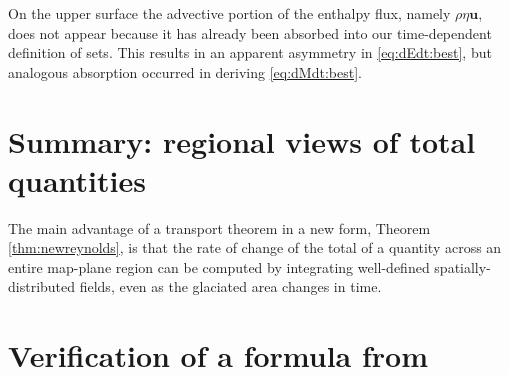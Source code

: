 \documentclass[11pt]{amsart}
\theoremstyle{definition}
\newcommand{\grad}{\nabla}
\newcommand{\bu}{\mathbf{u}}
\begin{document}
On the upper surface the advective portion of the enthalpy flux, namely $\rho\eta\bu$, does not appear because it has already been absorbed into our time-dependent definition of sets.  This results in an apparent asymmetry in \eqref{eq:dEdt:best}, but analogous absorption occurred in deriving \eqref{eq:dMdt:best}.





\section{Summary: regional views of total quantities}

The main advantage of a transport theorem in a new form, Theorem \ref{thm:newreynolds}, is that the rate of change of the total of a quantity across an entire map-plane region can be computed by integrating well-defined spatially-distributed fields, even as the glaciated area changes in time.





\appendix

\section{Verification of a formula from \cite{Huss2013}}  \label{app:hussverif}
\end{document}
